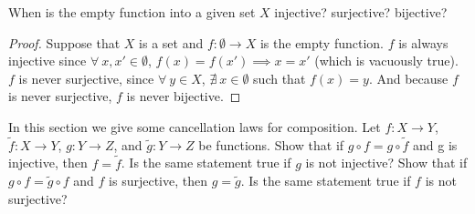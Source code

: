 \begin{exercise}\label{ex 3.3.3}
    When is the empty function into a given set \(X\) injective?
    surjective?
    bijective?
\end{exercise}

\begin{proof}
    Suppose that \(X\) is a set and \(f : \emptyset \to X\) is the empty function.
    \(f\) is always injective since \(\forall\ x, x' \in \emptyset\), \(f(x) = f(x') \implies x = x'\) (which is vacuously true).
    \(f\) is never surjective, since \(\forall\ y \in X\), \(\nexists\ x \in \emptyset\) such that \(f(x) = y\).
    And because \(f\) is never surjective, \(f\) is never bijective.
\end{proof}

\begin{exercise}\label{ex 3.3.4}
    In this section we give some cancellation laws for composition.
    Let \(f : X \to Y\), \(\tilde{f} : X \to Y\), \(g : Y \to Z\), and \(\tilde{g} : Y \to Z\) be functions.
    Show that if \(g \circ f = g \circ \tilde{f}\) and g is injective, then \(f = \tilde{f}\).
    Is the same statement true if \(g\) is not injective?
    Show that if \(g \circ f = \tilde{g} \circ f\) and \(f\) is surjective, then \(g = \tilde{g}\).
    Is the same statement true if \(f\) is not surjective?
\end{exercise}

